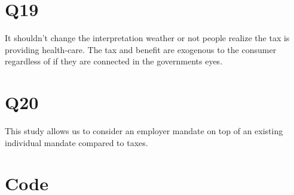 \documentclass[11pt]{article}
\begin{document}
\section{Q19}
It shouldn't change the interpretation weather or not people realize the tax is providing health-care. The tax and benefit are exogenous to the consumer regardless of if they are connected in the governments eyes.

\section{Q20}

This study allows us to consider an employer mandate on top of an existing individual mandate compared to taxes.

\section{Code}





\end{document}
